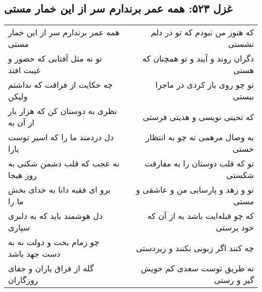 \begin{center}
\section*{غزل ۵۲۳: همه عمر برندارم سر از این خمار مستی}
\label{sec:523}
\begin{longtable}{l p{0.5cm} r}
همه عمر برندارم سر از این خمار مستی
&&
که هنوز من نبودم که تو در دلم نشستی
\\
تو نه مثل آفتابی که حضور و غیبت افتد
&&
دگران روند و آیند و تو همچنان که هستی
\\
چه حکایت از فراقت که نداشتم ولیکن
&&
تو چو روی باز کردی در ماجرا ببستی
\\
نظری به دوستان کن که هزار بار از آن به
&&
که تحیتی نویسی و هدیتی فرستی
\\
دل دردمند ما را که اسیر توست یارا
&&
به وصال مرهمی نه چو به انتظار خستی
\\
نه عجب که قلب دشمن شکنی به روز هیجا
&&
تو که قلب دوستان را به مفارقت شکستی
\\
برو ای فقیه دانا به خدای بخش ما را
&&
تو و زهد و پارسایی من و عاشقی و مستی
\\
دل هوشمند باید که به دلبری سپاری
&&
که چو قبله‌ایت باشد به از آن که خود پرستی
\\
چو زمام بخت و دولت نه به دست جهد باشد
&&
چه کنند اگر زبونی نکنند و زیردستی
\\
گله از فراق یاران و جفای روزگاران
&&
نه طریق توست سعدی کم خویش گیر و رستی
\\
\end{longtable}
\end{center}
